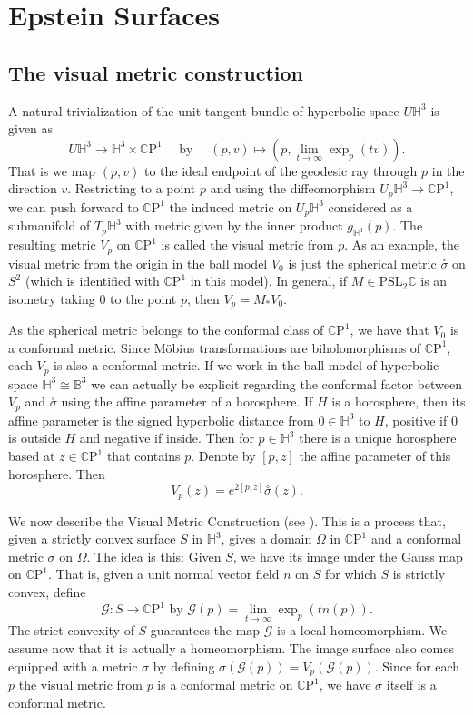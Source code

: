 \documentclass{amsart}
\newcommand{\C}{\mathbb{C}}
\newcommand{\CP}{\mathbb{C}\mathrm{P}}
\renewcommand{\H}{\mathbb{H}}
\begin{document}
\section{Epstein Surfaces} \label{epstein-surfaces}



\subsection{The visual metric construction}


A natural trivialization of the unit tangent bundle of hyperbolic space $U\H^3$ is given as
\[
U\H^3 \to \H^3 \times \CP^1
\quad \text{ by } \quad
(p,v) \mapsto (p, \lim_{t \to \infty} \exp_p (tv) ).
\]
That is we map $(p,v)$ to the ideal endpoint of the geodesic ray through $p$ in the direction $v$. 
Restricting to a point $p$ and using the diffeomorphism $U_p\H^3 \to \CP^1$, we can push forward to $\CP^1$ the induced metric on $U_p\H^3$ considered as a submanifold of $T_p\H^3$ with metric given by the inner product $g_{\H^3}(p)$. 
The resulting metric $V_p$ on $\CP^1$ is called the visual metric from $p$.
As an example, the visual metric from the origin in the ball model $V_0$ is just the spherical metric $\overset{\circ}{\sigma}$ on $S^2$ (which is identified with $\CP^1$ in this model). 
In general, if $M \in \mathrm{PSL}_2\C$ is an isometry taking $0$ to the point $p$, then $V_p = M_*V_0$. 

As the spherical metric belongs to the conformal class of $\CP^1$, we have that $V_0$ is a conformal metric. 
Since M\"obius transformations are biholomorphisms of $\CP^1$, each $V_p$ is also a conformal metric. 
If we work in the ball model of hyperbolic space $\H^3 \cong \mathbb{B}^3$ we can actually be explicit regarding the conformal factor between $V_p$ and $\overset{\circ}{\sigma}$ using the affine parameter of a horosphere. 
If $H$ is a horosphere, then its affine parameter is the signed hyperbolic distance from $0 \in \H^3$ to $H$, positive if $0$ is outside $H$ and negative if inside. 
Then for $p \in \H^3$ there is a unique horosphere based at $z \in \CP^1$ that contains $p$. 
Denote by $[p,z]$ the affine parameter of this horosphere. 
Then
\[
V_p(z) = e^{2[p,z]}\overset{\circ}{\sigma}(z).
\]

We now describe the Visual Metric Construction (see \cite{anderson1998}). 
This is a process that, given a strictly convex surface $S$ in $\H^3$, gives a domain $\Omega$ in $\CP^1$ and a conformal metric $\sigma$ on $\Omega$.
The idea is this: Given $S$, we have its image under the Gauss map on $\CP^1$. 
That is, given a unit normal vector field $n$ on $S$ for which $S$ is strictly convex, define
\[
\mathcal{G}:S \to \CP^1 \text{ by } \mathcal{G}(p) = \lim_{t \to \infty} \exp_p(t n(p)).
\]
The strict convexity of $S$ guarantees the map $\mathcal{G}$ is a local homeomorphism. 
We assume now that it is actually a homeomorphism.
The image surface also comes equipped with a metric $\sigma$ by defining $\sigma(\mathcal{G}(p)) = V_p(\mathcal{G}(p))$. 
Since for each $p$ the visual metric from $p$ is a conformal metric on $\CP^1$, we have $\sigma$ itself is a conformal metric. 
\end{document}
